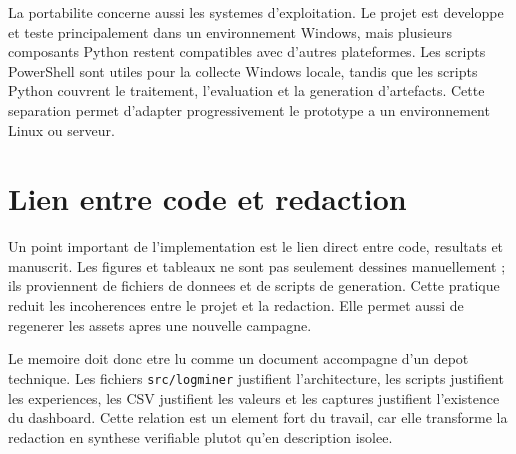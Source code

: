 La portabilite concerne aussi les systemes d'exploitation. Le projet est developpe et teste principalement dans un environnement Windows, mais plusieurs composants Python restent compatibles avec d'autres plateformes. Les scripts PowerShell sont utiles pour la collecte Windows locale, tandis que les scripts Python couvrent le traitement, l'evaluation et la generation d'artefacts. Cette separation permet d'adapter progressivement le prototype a un environnement Linux ou serveur.

\section{Lien entre code et redaction}
Un point important de l'implementation est le lien direct entre code, resultats et manuscrit. Les figures et tableaux ne sont pas seulement dessines manuellement ; ils proviennent de fichiers de donnees et de scripts de generation. Cette pratique reduit les incoherences entre le projet et la redaction. Elle permet aussi de regenerer les assets apres une nouvelle campagne.

Le memoire doit donc etre lu comme un document accompagne d'un depot technique. Les fichiers \texttt{src/logminer} justifient l'architecture, les scripts justifient les experiences, les CSV justifient les valeurs et les captures justifient l'existence du dashboard. Cette relation est un element fort du travail, car elle transforme la redaction en synthese verifiable plutot qu'en description isolee.

